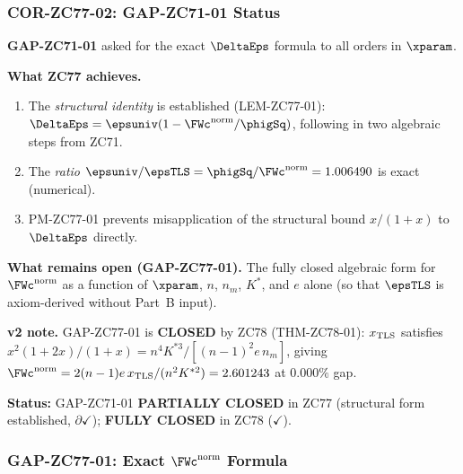 \documentclass[12pt, a4paper]{article}
\begin{document}
\subsubsection{COR-ZC77-02: GAP-ZC71-01 Status}
\label{sec:cor02}

\begin{formalbox}[title={COR-ZC77-02: GAP-ZC71-01 --- Partial Closure
  (completed by ZC78)}]

\textbf{GAP-ZC71-01} asked for the exact $\DeltaEps$ formula to all
orders in $\xparam$.

\textbf{What ZC77 achieves.}
\begin{enumerate}[leftmargin=2em, noitemsep]
  \item The \emph{structural identity} is established (LEM-ZC77-01):
    $\DeltaEps = \epsuniv(1 - \FWc^{\rm norm}/\phigSq)$,
    following in two algebraic steps from ZC71.
  \item The \emph{ratio} $\epsuniv/\epsTLS = \phigSq/\FWc^{\rm norm}
    = 1.006490$ is exact (numerical).
  \item PM-ZC77-01 prevents misapplication of the structural bound
    $x/(1+x)$ to $\DeltaEps$ directly.
\end{enumerate}

\textbf{What remains open (GAP-ZC77-01).}
The fully closed algebraic form for $\FWc^{\rm norm}$ as a function
of $\xparam$, $n$, $n_m$, $K^*$, and $e$ alone (so that $\epsTLS$
is axiom-derived without Part~B input).

\textbf{v2 note.} GAP-ZC77-01 is \textbf{CLOSED} by ZC78 (THM-ZC78-01):
$x_{\rm TLS}$ satisfies $x^2(1+2x)/(1+x) = n^4 K^{*3}/[(n-1)^2 e\, n_m]$,
giving $\FWc^{\rm norm} = 2(n-1)e\, x_{\rm TLS}/(n^2 K^{*2}) = 2.601243$
at $0.000\%$ gap.

\textbf{Status:} GAP-ZC71-01 \textbf{PARTIALLY CLOSED} in ZC77
(structural form established, $\partial\checkmark$);
\textbf{FULLY CLOSED} in ZC78 ($\checkmark$).
\end{formalbox}

\subsubsection{GAP-ZC77-01: Exact $\FWc^{\rm norm}$ Formula}
\label{sec:gap01}
\end{document}
